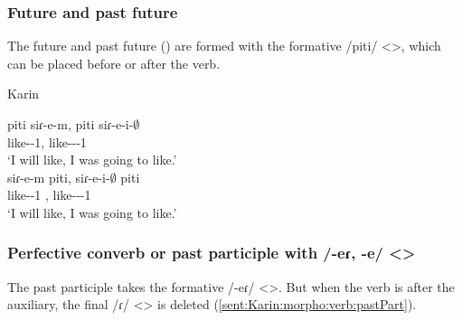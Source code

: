 \subsubsection{Future and past future}

The future and past future () are formed with the formative /piti/ <>, which can be placed before or after the verb. 



\begin{exe}
	\ex Karin \label{sent:Karin:morpho:verb:fut}
	\begin{xlist}
		\ex \gll piti siɾ-e-m, piti siɾ-e-i-$\emptyset$ \\
		{\fut} like-{\thgloss}-1{\sg}, {\fut} like-{\thgloss}-{\pst}-1{\sg} \\
		\trans `I will like, I was going to like.' \\
		\ex \gll siɾ-e-m piti, siɾ-e-i-$\emptyset$ piti\\
		like-{\thgloss}-1{\sg} {\fut}, like-{\thgloss}-{\pst}-1{\sg} {\fut} \\
		\trans `I will like, I was going to like.' \\
	\end{xlist}
\end{exe}


\subsubsection{Perfective converb or past participle with /-eɾ, -e/ <>}

The past participle takes the formative /-eɾ/ <>. But when the verb is after the auxiliary, the final /ɾ/ <> is deleted (\ref{sent:Karin:morpho:verb:pastPart}). 

